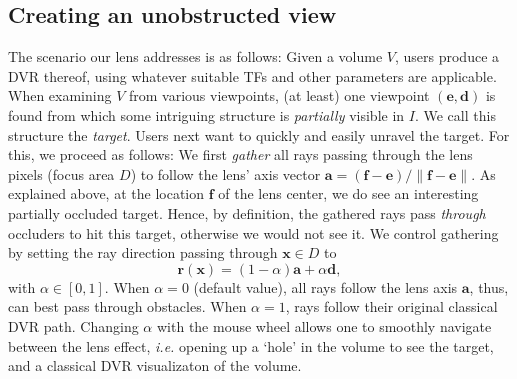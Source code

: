 \subsection{Creating an unobstructed view}
\label{sec:gathering}
%
The scenario our lens addresses is as follows: Given a volume $V$, users produce a DVR thereof, using whatever suitable TFs and other parameters are applicable. When examining $V$ from various viewpoints, (at least) one viewpoint $(\mathbf{e},\mathbf{d})$ is found from which some intriguing structure is \emph{partially} visible in $I$. We call this structure the \emph{target}. Users next want to quickly and easily unravel the target. For this, we proceed as follows: We first \emph{gather} all rays passing through the lens pixels (focus area $D$) to follow the lens' axis vector $\mathbf{a} = (\mathbf{f} - \mathbf{e}) / \| \mathbf{f} - \mathbf{e} \|$. As explained above, at the location $\mathbf{f}$ of the lens center, we do see an interesting partially occluded target. Hence, by definition, the gathered rays pass \emph{through} occluders to hit this target, otherwise we would not see it. We control gathering by setting the ray direction passing through $\mathbf{x} \in D$ to
%
\begin{equation}
\mathbf{r}(\mathbf{x}) = (1-\alpha) \mathbf{a} + \alpha \mathbf{d},
\label{eqn:gathering}
\end{equation}
%
with $\alpha \in [0,1]$. When $\alpha=0$ (default value), all rays follow the lens axis $\mathbf{a}$, thus, can best pass through obstacles. When $\alpha=1$, rays follow their original classical DVR path. Changing $\alpha$ with the mouse wheel allows one to smoothly navigate between the lens effect, \emph{i.e.} opening up a `hole' in the volume to see the target, and a classical DVR visualizaton of the volume.
%
